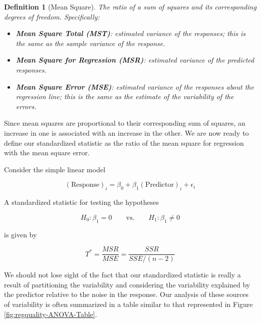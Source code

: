 \documentclass[
]{book}
\providecommand{\tightlist}{%
  \setlength{\itemsep}{0pt}\setlength{\parskip}{0pt}}
\theoremstyle{plain}
\theoremstyle{mydefn}
\newtheorem{definition}{Definition}[chapter]
\theoremstyle{myexmpl}
\theoremstyle{remark}
\begin{document}
\begin{definition}[Mean Square]
\protect\hypertarget{def:defn-ms}{}{\label{def:defn-ms} {} }The ratio of a sum of squares and its corresponding degrees of freedom. Specifically:

\begin{itemize}
\tightlist
\item
  \textbf{Mean Square Total (MST)}: estimated variance of the responses; this is the same as the sample variance of the response.
\item
  \textbf{Mean Square for Regression (MSR)}: estimated variance of the predicted responses.
\item
  \textbf{Mean Square Error (MSE)}: estimated variance of the responses about the regression line; this is the same as the estimate of the variability of the errors.
\end{itemize}
\end{definition}

Since mean squares are proportional to their corresponding sum of squares, an increase in one is associated with an increase in the other. We are now ready to define our standardized statistic as the ratio of the mean square for regression with the mean square error.

\begin{rmdkeyidea}
Consider the simple linear model

\[(\text{Response})_i = \beta_0 + \beta_1(\text{Predictor})_i + \epsilon_i\]

A standardized statistic for testing the hypotheses

\[H_0: \beta_1 = 0 \qquad \text{vs.} \qquad H_1: \beta_1 \neq 0\]

is given by

\[T^* = \frac{MSR}{MSE} = \frac{SSR}{SSE/(n-2)}\]
\end{rmdkeyidea}

We should not lose sight of the fact that our standardized statistic is really a result of partitioning the variability and considering the variability explained by the predictor relative to the noise in the response. Our analysis of these sources of variability is often summarized in a table similar to that represented in Figure \ref{fig:regquality-ANOVA-Table}.
\end{document}
